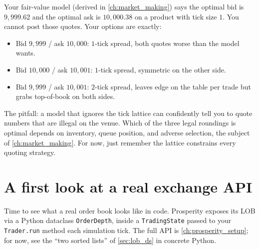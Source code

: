 \begin{pitfallbox}
Your fair-value model (derived in \cref{ch:market_making}) says the
optimal bid is $9{,}999.62$ and the optimal ask is $10{,}000.38$ on a
product with tick size $1$. You cannot post those quotes. Your
options are exactly:
\begin{itemize}
  \item Bid $9{,}999$ / ask $10{,}000$: $1$-tick spread, both quotes
  worse than the model wants.
  \item Bid $10{,}000$ / ask $10{,}001$: $1$-tick spread, symmetric on
  the other side.
  \item Bid $9{,}999$ / ask $10{,}001$: $2$-tick spread, leaves edge
  on the table per trade but grabs top-of-book on both sides.
\end{itemize}
The pitfall: a model that ignores the tick lattice can confidently
tell you to quote numbers that are illegal on the venue. Which of the
three legal roundings is optimal depends on inventory, queue position,
and adverse selection, the subject of \cref{ch:market_making}. For now,
just remember the lattice constrains every quoting strategy.
\end{pitfallbox}

\section{A first look at a real exchange API}
\label{sec:first_prosperity}

Time to see what a real order book looks like in code. Prosperity
exposes its LOB via a Python dataclass \texttt{OrderDepth}, inside a
\texttt{TradingState} passed to your \texttt{Trader.run} method each
simulation tick. The full API is \cref{ch:prosperity_setup}; for now,
see the ``two sorted lists'' of \cref{sec:lob_ds} in concrete Python.

